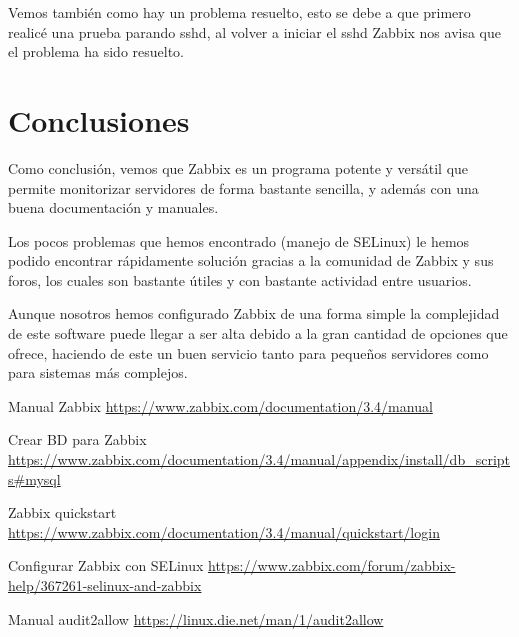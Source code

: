 \documentclass[12pt, spanish]{article}
\begin{document}
Vemos también como hay un problema resuelto, esto se debe a que primero realicé una prueba parando sshd, al volver a iniciar el sshd Zabbix nos avisa que el problema ha sido resuelto.


\section{Conclusiones}

Como conclusión, vemos que Zabbix es un programa potente y versátil que permite monitorizar servidores de forma bastante sencilla, y además con una buena documentación y manuales.

Los pocos problemas que hemos encontrado (manejo de SELinux) le hemos podido encontrar  rápidamente solución gracias a la comunidad de Zabbix y sus foros, los cuales son bastante útiles y con bastante actividad entre usuarios.

Aunque nosotros hemos configurado Zabbix de una forma simple la complejidad de este software puede llegar a ser alta debido a la gran cantidad de opciones que ofrece, haciendo de este un buen servicio tanto para pequeños servidores como para sistemas más complejos.

\newpage

\begin{thebibliography}{9}

Manual Zabbix \url{https://www.zabbix.com/documentation/3.4/manual}

Crear BD para Zabbix \url{https://www.zabbix.com/documentation/3.4/manual/appendix/install/db_scripts#mysql}

Zabbix quickstart \url{https://www.zabbix.com/documentation/3.4/manual/quickstart/login}

Configurar Zabbix con SELinux  \url{https://www.zabbix.com/forum/zabbix-help/367261-selinux-and-zabbix}

Manual audit2allow \url{https://linux.die.net/man/1/audit2allow}

\end{thebibliography}
\end{document}
